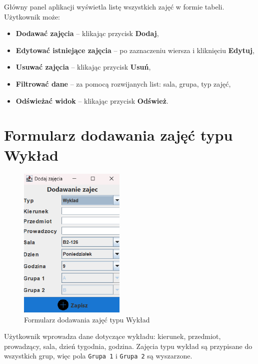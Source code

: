 Główny panel aplikacji wyświetla listę wszystkich zajęć w formie tabeli. Użytkownik może:
\begin{itemize}
    \item \textbf{Dodawać zajęcia} – klikając przycisk \textbf{Dodaj},
    \item \textbf{Edytować istniejące zajęcia} – po zaznaczeniu wiersza i kliknięciu \textbf{Edytuj},
    \item \textbf{Usuwać zajęcia} – klikając przycisk \textbf{Usuń},
    \item \textbf{Filtrować dane} – za pomocą rozwijanych list: sala, grupa, typ zajęć,
    \item \textbf{Odświeżać widok} – klikając przycisk \textbf{Odśwież}.
\end{itemize}

\section*{Formularz dodawania zajęć typu Wykład}
\begin{figure}[H]
\centering
\includegraphics[width=0.45\textwidth]{figures/workApl/add_wyklad_panel.png}
\caption{Formularz dodawania zajęć typu Wykład}
\label{fig:add_wyklad}
\end{figure}

Użytkownik wprowadza dane dotyczące wykładu: kierunek, przedmiot, prowadzący, sala, dzień tygodnia, godzina. Zajęcia typu wykład są przypisane do wszystkich grup, więc pola \texttt{Grupa 1} i \texttt{Grupa 2} są wyszarzone.

